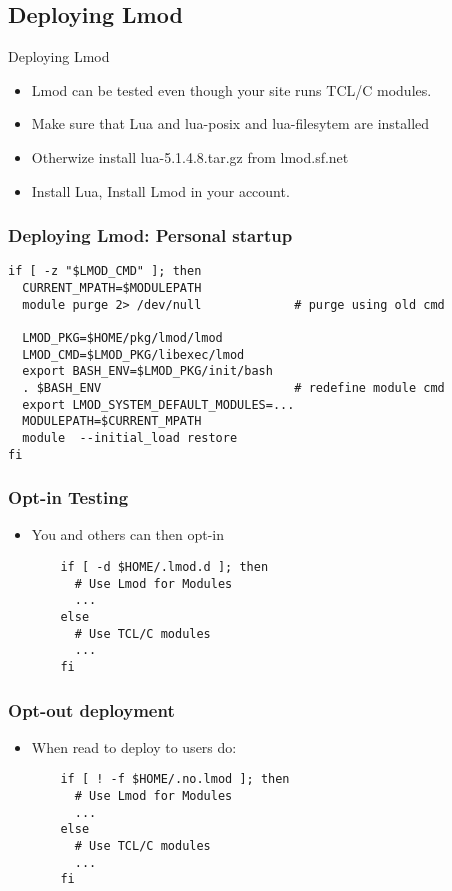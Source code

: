 \documentclass{beamer}
\begin{document}
\subsection{Deploying Lmod}
\label{sec:deploying_lmod}

\begin{frame}{Deploying Lmod}
  \begin{itemize}
    \item Lmod can be tested even though your site runs TCL/C modules.
    \item Make sure that Lua and lua-posix and lua-filesytem are installed
    \item Otherwize install lua-5.1.4.8.tar.gz from lmod.sf.net
    \item Install Lua, Install Lmod in your account.
  \end{itemize}
\end{frame}

\begin{frame}[fragile]
    \frametitle{Deploying Lmod: Personal startup}
    {\small
\begin{verbatim}
if [ -z "$LMOD_CMD" ]; then
  CURRENT_MPATH=$MODULEPATH
  module purge 2> /dev/null             # purge using old cmd

  LMOD_PKG=$HOME/pkg/lmod/lmod
  LMOD_CMD=$LMOD_PKG/libexec/lmod
  export BASH_ENV=$LMOD_PKG/init/bash
  . $BASH_ENV                           # redefine module cmd
  export LMOD_SYSTEM_DEFAULT_MODULES=...
  MODULEPATH=$CURRENT_MPATH
  module  --initial_load restore
fi
\end{verbatim}
}
\end{frame}

\begin{frame}[fragile]
    \frametitle{Opt-in Testing}
  \begin{itemize}
    \item You and others can then opt-in 
    {\small
\begin{verbatim}
    if [ -d $HOME/.lmod.d ]; then
      # Use Lmod for Modules
      ...
    else
      # Use TCL/C modules
      ...
    fi
\end{verbatim}
}
  \end{itemize}
\end{frame}

\begin{frame}[fragile]
    \frametitle{Opt-out deployment}
  \begin{itemize}
    \item When read to deploy to users do:
    {\small
\begin{verbatim}
    if [ ! -f $HOME/.no.lmod ]; then
      # Use Lmod for Modules
      ...
    else
      # Use TCL/C modules
      ...
    fi

\end{verbatim}
}
  \end{itemize}
\end{frame}
\end{document}
